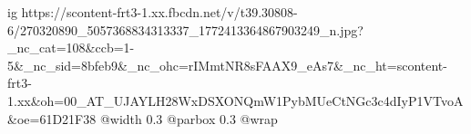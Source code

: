  
 
 
 
 

\ifcmt
  ig https://scontent-frt3-1.xx.fbcdn.net/v/t39.30808-6/270320890_5057368834313337_1772413364867903249_n.jpg?_nc_cat=108&ccb=1-5&_nc_sid=8bfeb9&_nc_ohc=rIMmtNR8sFAAX9_eAs7&_nc_ht=scontent-frt3-1.xx&oh=00_AT_UJAYLH28WxDSXONQmW1PybMUeCtNGc3c4dIyP1VTvoA&oe=61D21F38
  @width 0.3
  @parbox 0.3
  @wrap \parpic[r]
\fi
